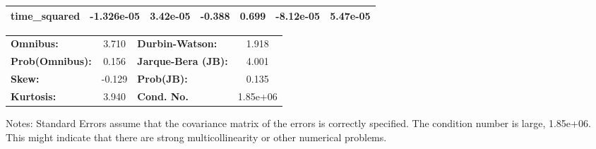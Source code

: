 \begin{center}
\begin{tabular}{lcccccc}
\textbf{time\_squared}          &   -1.326e-05  &     3.42e-05     &    -0.388  &         0.699        &    -8.12e-05    &     5.47e-05     \\
\bottomrule
\end{tabular}
\begin{tabular}{lclc}
\textbf{Omnibus:}       &  3.710 & \textbf{  Durbin-Watson:     } &    1.918  \\
\textbf{Prob(Omnibus):} &  0.156 & \textbf{  Jarque-Bera (JB):  } &    4.001  \\
\textbf{Skew:}          & -0.129 & \textbf{  Prob(JB):          } &    0.135  \\
\textbf{Kurtosis:}      &  3.940 & \textbf{  Cond. No.          } & 1.85e+06  \\
\bottomrule
\end{tabular}
\end{center}

Notes: \newline
 [1] Standard Errors assume that the covariance matrix of the errors is correctly specified. \newline
 [2] The condition number is large, 1.85e+06. This might indicate that there are \newline
 strong multicollinearity or other numerical problems.